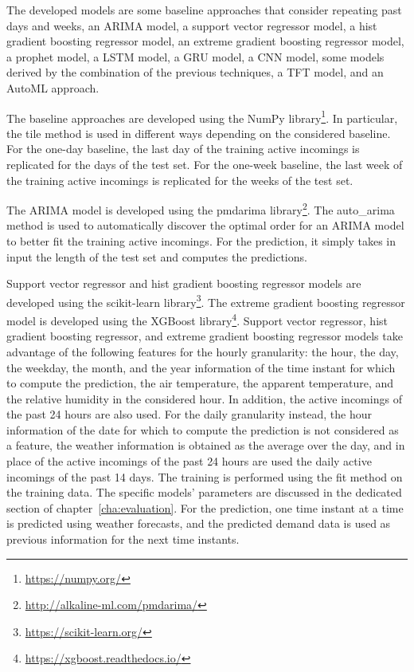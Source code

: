 The developed models are some baseline approaches that consider repeating past days and weeks, an ARIMA model, a support vector regressor model, a hist gradient boosting regressor model, an extreme gradient boosting regressor model, a prophet model, a LSTM model, a GRU model, a CNN model, some models derived by the combination of the previous techniques, a TFT model, and an AutoML approach.

The baseline approaches are developed using the NumPy library\footnote{ \url{https://numpy.org/} }.
In particular, the tile method is used in different ways depending on the considered baseline.
For the one-day baseline, the last day of the training active incomings is replicated for the days of the test set.
For the one-week baseline, the last week of the training active incomings is replicated for the weeks of the test set.

The ARIMA model is developed using the pmdarima library\footnote{ \url{http://alkaline-ml.com/pmdarima/} }.
The auto\_arima method is used to automatically discover the optimal order for an ARIMA model to better fit the training active incomings.
For the prediction, it simply takes in input the length of the test set and computes the predictions.

Support vector regressor and hist gradient boosting regressor models are developed using the scikit-learn library\footnote{ \url{https://scikit-learn.org/} }.
The extreme gradient boosting regressor model is developed using the XGBoost library\footnote{ \url{https://xgboost.readthedocs.io/} }.
Support vector regressor, hist gradient boosting regressor, and extreme gradient boosting regressor models take advantage of the following features for the hourly granularity: the hour, the day, the weekday, the month, and the year information of the time instant for which to compute the prediction, the air temperature, the apparent temperature, and the relative humidity in the considered hour.
In addition, the active incomings of the past 24 hours are also used.
For the daily granularity instead, the hour information of the date for which to compute the prediction is not considered as a feature, the weather information is obtained as the average over the day, and in place of the active incomings of the past 24 hours are used the daily active incomings of the past 14 days.
The training is performed using the fit method on the training data.
The specific models’ parameters are discussed in the dedicated section of chapter~\ref{cha:evaluation}.
For the prediction, one time instant at a time is predicted using weather forecasts, and the predicted demand data is used as previous information for the next time instants.

